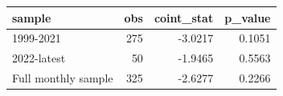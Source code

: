 \begin{tabular}{lrrr}
\toprule
sample & obs & coint\_stat & p\_value \\
\midrule
1999-2021 & 275 & -3.0217 & 0.1051 \\
2022-latest & 50 & -1.9465 & 0.5563 \\
Full monthly sample & 325 & -2.6277 & 0.2266 \\
\bottomrule
\end{tabular}
